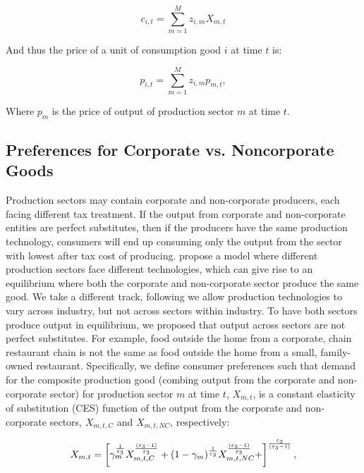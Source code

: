              \begin{equation} \label{eqn:mix_cons}
             c_{i,t} = \sum_{m=1}^{M}z_{i,m}X_{m,t} 
    	\end{equation}
	
	And thus the price of a unit of consumption good $i$ at time $t$ is:
	
             \begin{equation} \label{eqn:mix_cons_price}
             p_{i,t} = \sum_{m=1}^{M}z_{i,m}p_{m,t}, 
    	\end{equation}
    
    Where $p_{m}$ is the price of output of production sector $m$ at time $t$.
    
    \subsection{Preferences for Corporate vs. Noncorporate Goods}\label{sec:pref_corp_noncorp}
    
    Production sectors may contain corporate and non-corporate producers, each facing different tax treatment.  If the output from corporate and non-corporate entities are perfect substitutes, then if the producers have the same production technology, consumers will end up consuming only the output from the sector with lowest after tax cost of producing.  \citet{GK1989} propose a model where different production sectors face different technologies, which can give rise to an equilibrium where both the corporate and non-corporate sector produce the same good.  We take a different track, following \citet{FR1993} we allow production technologies to vary across industry, but not across sectors within industry.  To have both sectors produce output in equilibrium, we proposed that output across sectors are not perfect substitutes.  For example, food outside the home from a corporate, chain restaurant chain is not the same as food outside the home from a small, family-owned restaurant.  Specifically, we define consumer preferences such that demand for the composite production good (combing output from the corporate and non-corporate sector) for production sector $m$ at time $t$, $X_{m,t}$, is a constant elasticity of substitution (CES) function of the output from the corporate and non-corporate sectors, $X_{m,t,C}$ and $X_{m,t,NC}$, respectively:
    
                  \begin{equation} \label{eqn:comp_output}
             X_{m,t} = \left[\gamma_{m}^{\frac{1}{\varepsilon_{3}}}X_{m,t,C}^{\frac{(\varepsilon_{3}-1)}{\varepsilon_{3}}}+(1-\gamma_{m})^{\frac{1}{\varepsilon_{3}}}X_{m,t,NC}^{\frac{(\varepsilon_{3}-1)}{\varepsilon_{3}}}+\right]^{\frac{\varepsilon_{3}}{(\varepsilon_{3}-1)}}, 
    	\end{equation}
	
